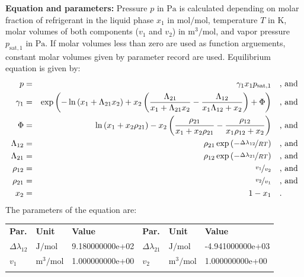 \textbf{Equation and parameters:}
\newline
%
Pressure $p$ in $\si{\pascal}$ is calculated depending on molar fraction of refrigerant in the liquid phase $x_1$ in $\si{\mole\per\mole}$, temperature $T$ in $\si{\kelvin}$, molar volumes of both components ($v_1$ and $v_2$) in $\si{\cubic\meter\per\mole}$, and vapor pressure $p_\mathrm{sat,1}$ in $\si{\pascal}$. If molar volumes less than zero are used as function arguements, constant molar volumes given by parameter record are used. Equilibrium equation is given by:
%
\begin{equation*}
\begin{split}
p &=& \gamma_1 x_1 p_\mathrm{sat,1} & \quad\text{, and} \\
\gamma_1 &=& \exp \left( - \ln \left( x_1 + \Lambda_{21} x_2 \right) + x_2 \left( \frac{\Lambda_{21}}{x_1 + \Lambda_{21} x_2} - \frac{\Lambda_{12}}{x_1 \Lambda_{12} + x_2} \right) + \Phi \right) & \quad\text{, and} \\
\Phi &=& \ln \left( x_1 + x_2 \rho_{21} \right) - x_2 \left( \frac{\rho_{21}}{x_1 + x_2 \rho_{21}} - \frac{\rho_{12}}{x_1 \rho_{12} + x_2} \right) & \quad\text{, and} \\
\Lambda_{12} &=& \rho_{21} \exp \left( - \nicefrac{\Delta\lambda_{12}}{R T} \right) & \quad\text{, and} \\
\Lambda_{21} &=& \rho_{12} \exp \left( - \nicefrac{\Delta\lambda_{21}}{R T} \right) & \quad\text{, and} \\
\rho_{12} &=& \nicefrac{v_1}{v_2} & \quad\text{, and} \\
\rho_{21} &=& \nicefrac{v_2}{v_1} & \quad\text{, and} \\
x_2 &=& 1 - x_1  & \quad\text{.} \\
\end{split}
\end{equation*}
%
The parameters of the equation are:
%
\begin{longtable}[l]{lll|lll}
\toprule
\addlinespace
\textbf{Par.} & \textbf{Unit} & \textbf{Value} &	\textbf{Par.} & \textbf{Unit} & \textbf{Value} \\
\addlinespace
\midrule
\endhead

\bottomrule
\endfoot
\bottomrule
\endlastfoot
\addlinespace

$\Delta\lambda_{12}$ & $\si{\joule\per\mole}$ & 9.180000000e+02 & $\Delta\lambda_{21}$ & $\si{\joule\per\mole}$ & -4.941000000e+03 \\
$v_1$ & $\si{\cubic\meter\per\mole}$ & 1.000000000e+00 & $v_2$ & $\si{\cubic\meter\per\mole}$ & 1.000000000e+00 \\

\addlinespace\end{longtable}

